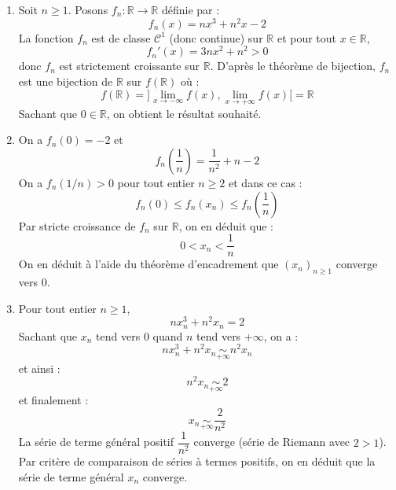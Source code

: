 \documentclass[a4paper,10pt]{report}
\newcommand{\Sum}[2]{\ensuremath{\textstyle{\sum\limits_{#1}^{#2}}}}
\begin{document}
\corr 

\begin{enumerate}
\item Soit $n \geq 1$. Posons $f_n : \mathbb{R} \rightarrow \mathbb{R}$ définie par :
$$ f_n(x) = nx^3+n^2x-2$$
La fonction $f_n$ est de classe $\mathcal{C}^1$ (donc continue) sur $\mathbb{R}$ et pour tout $x \in \mathbb{R}$,
$$ f_n'(x) = 3nx^2 + n^2 >0$$
donc $f_n$ est strictement croissante sur $\mathbb{R}$. D'après le théorème de bijection, $f_n$ est une bijection de $\mathbb{R}$ sur $f(\mathbb{R})$ où :
$$ f(\mathbb{R}) =  ]\lim_{x \rightarrow - \infty} f(x), \lim_{x \rightarrow +\infty} f(x)[= \mathbb{R}$$
Sachant que $0 \in \mathbb{R}$, on obtient le résultat souhaité.
\item On a $f_n(0)=-2$ et 
$$ f_n \left( \dfrac{1}{n} \right) = \dfrac{1}{n^2} + n -2$$
On a $f_n(1/n)>0$ pour tout entier $n \geq 2$ et dans ce cas :
$$ f_n(0) \leq f_n(x_n) \leq f_n \left( \dfrac{1}{n} \right) $$
Par stricte croissance de $f_n$ sur $\mathbb{R}$, on en déduit que :
$$ 0 < x_n < \dfrac{1}{n}$$
On en déduit à l'aide du théorème d'encadrement que $(x_n)_{n \geq 1}$ converge vers $0$.
\item Pour tout entier $n \geq 1$,
$$ nx_n^3+n^2x_n=2$$
Sachant que $x_n$ tend vers $0$ quand $n$ tend vers $+ \infty$, on a :
$$ nx_n^3+n^2x_n \underset{+ \infty}{\sim} n^2 x_n$$
et ainsi :
$$ 
n^2 x_n \underset{+ \infty}{\sim} 2$$
et finalement :
$$ x_n \underset{+ \infty}{\sim}  \dfrac{2}{n^2}$$
La série de terme général positif $\dfrac{1}{n^2}$ converge (série de Riemann avec $2>1$). Par critère de comparaison de séries à termes positifs, on en déduit que la série de terme général $x_n$ converge.
\end{enumerate}
%
%
\end{document}
